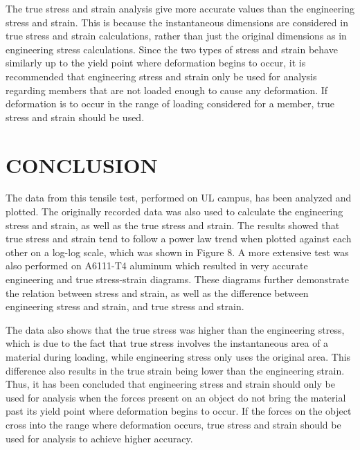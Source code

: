 \documentclass[12pt]{article}
\begin{document}
\bigskip





\newpage

The true stress and strain analysis give more accurate values than the engineering stress and strain. This is because the instantaneous dimensions are considered in true stress and strain calculations, rather than just the original dimensions as in engineering stress calculations. Since the two types of stress and strain behave similarly up to the yield point where deformation begins to occur, it is recommended that engineering stress and strain only be used for analysis regarding members that are not loaded enough to cause any deformation. If deformation is to occur in the range of loading considered for a member, true stress and strain should be used. 
\bigskip

\section*{\fontsize{12}{12}\selectfont CONCLUSION}
The data from this tensile test, performed on UL campus, has been analyzed and plotted. The originally recorded data was also used to calculate the engineering stress and strain, as well as the true stress and strain. The results showed that true stress and strain tend to follow a power law trend when plotted against each other on a log-log scale, which was shown in Figure 8. A more extensive test was also performed on A6111-T4 aluminum which resulted in very accurate engineering and true stress-strain diagrams. These diagrams further demonstrate the relation between stress and strain, as well as the difference between engineering stress and strain, and true stress and strain.
\bigskip

The data also shows that the true stress was higher than the engineering stress, which is due to the fact that true stress involves the instantaneous area of a material during loading, while engineering stress only uses the original area. This difference also results in the true strain being lower than the engineering strain. Thus, it has been concluded that engineering stress and strain should only be used for analysis when the forces present on an object do not bring the material past its yield point where deformation begins to occur. If the forces on the object cross into the range where deformation occurs, true stress and strain should be used for analysis to achieve higher accuracy.
\bigskip
\end{document}
